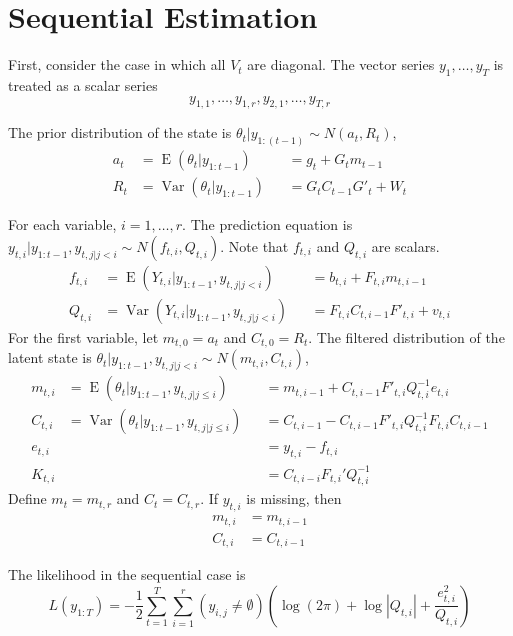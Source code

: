 \documentclass{article}\usepackage[]{graphicx}\usepackage[]{color}
\DeclareMathOperator{\E}{E}
\DeclareMathOperator{\Var}{Var}
\begin{document}
\section{Sequential Estimation}

First, consider the case in which all $V_{t}$ are diagonal.
The vector series $y_{1}, \dots, y_{T}$ is treated as a scalar series
\begin{equation}
  y_{1,1}, \dots, y_{1,r}, y_{2,1}, \dots, y_{T,r}
\end{equation}

The prior distribution of the state is $\theta_{t} | y_{1:(t-1)} \sim N(a_{t}, R_{t})$,
\begin{align}
  a_{t} &= \E(\theta_{t} | y_{1:t-1}) &&= g_{t} + G_{t} m_{t-1} \\
  R_{t} &= \Var(\theta_{t} | y_{1:t-1}) &&= G_{t} C_{t-1} G'_{t} + W_{t}
\end{align}

For each variable, $i = 1, \dots, r$.
The prediction equation is $y_{t,i} | y_{1:t-1}, y_{t,j|j < i} \sim N(f_{t,i}, Q_{t,i})$.
Note that $f_{t,i}$ and $Q_{t,i}$ are scalars.
\begin{align}
  f_{t,i} &= \E(Y_{t,i} | y_{1:t-1}, y_{t,j | j < i}) &&= b_{t,i} + F_{t,i} m_{t,i-1} \\
  Q_{t,i} &= \Var(Y_{t,i} | y_{1:t-1}, y_{t, j | j < i}) &&= F_{t,i} C_{t,i-1} F'_{t,i} + v_{t,i}
\end{align}
For the first variable, let $m_{t,0} = a_{t}$ and $C_{t,0} = R_{t}$.
The filtered distribution of the latent state is $\theta_{t} | y_{1:t-1}, y_{t,j|j < i} \sim N(m_{t,i}, C_{t,i})$,
\begin{align}
  m_{t,i} &= \E(\theta_{t} | y_{1:t-1}, y_{t, j | j \leq i}) &&= m_{t,i-1} + C_{t,i-1} F'_{t,i} Q_{t,i}^{-1} e_{t,i} \\
  C_{t,i} &= \Var(\theta_{t} | y_{1:t-1}, y_{t, j|j \leq i}) &&= C_{t,i-1} - C_{t,i-1} F'_{t,i} Q_{t,i}^{-1} F_{t,i} C_{t,i-1} \\
  e_{t,i} &&&= y_{t,i} - f_{t,i} \\
  K_{t,i} &&&= C_{t,i-i} F_{t,i}' Q_{t,i}^{-1}
\end{align}
Define $m_{t} = m_{t,r}$ and $C_{t} = C_{t,r}$.
If $y_{t,i}$ is missing, then 
\begin{align}
  m_{t,i} &= m_{t,i-1} \\
  C_{t,i} &= C_{t,i-1}
\end{align}

The likelihood in the sequential case is
\begin{equation}
  L(y_{1:T}) = -\frac{1}{2} \sum_{t=1}^{T} \sum_{i=1}^{r} (y_{i,j} \neq \emptyset)
  \left( 
    \log (2 \pi) + \log |Q_{t,i}| + \frac{e_{t,i}^{2}}{Q_{t,i}} 
  \right)
\end{equation}
\end{document}
